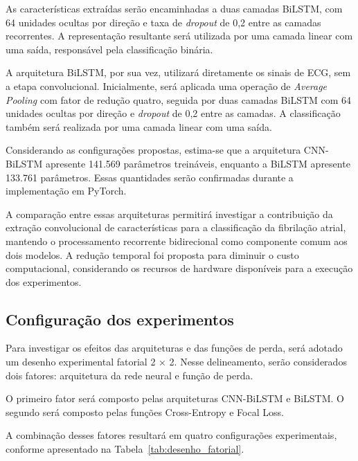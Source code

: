 \documentclass[
    12pt,                %
    openright,           %
    oneside,             %
    a4paper,             %
    english,             %
    brazil               %
]{abntex2}
\begin{document}
As características extraídas serão encaminhadas a
duas camadas BiLSTM, com 64 unidades ocultas por
direção e taxa de \textit{dropout} de 0,2 entre as
camadas recorrentes. A representação resultante
será utilizada por uma camada linear com uma saída,
responsável pela classificação binária.

A arquitetura BiLSTM, por sua vez, utilizará
diretamente os sinais de ECG, sem a etapa convolucional.
Inicialmente, será aplicada uma operação de
\textit{Average Pooling} com fator de redução quatro,
seguida por duas camadas BiLSTM com 64 unidades
ocultas por direção e \textit{dropout} de 0,2
entre as camadas. A classificação também será
realizada por uma camada linear com uma saída.

Considerando as configurações propostas, estima-se
que a arquitetura CNN-BiLSTM apresente 141.569
parâmetros treináveis, enquanto a BiLSTM apresente
133.761 parâmetros. Essas quantidades serão
confirmadas durante a implementação em PyTorch.

A comparação entre essas arquiteturas permitirá
investigar a contribuição da extração convolucional
de características para a classificação da
fibrilação atrial, mantendo o processamento
recorrente bidirecional como componente comum
aos dois modelos. A redução temporal foi proposta
para diminuir o custo computacional, considerando
os recursos de hardware disponíveis para a
execução dos experimentos.


\subsection{Configuração dos experimentos}
\label{subsec:config_experimentos}
Para investigar os efeitos das arquiteturas e das funções de perda, será adotado um desenho experimental fatorial 2 × 2. Nesse delineamento, serão considerados dois fatores: arquitetura da rede neural e função de perda.

O primeiro fator será composto pelas arquiteturas CNN-BiLSTM e BiLSTM. O segundo será composto pelas funções Cross-Entropy e Focal Loss.

A combinação desses fatores resultará em quatro configurações experimentais, conforme apresentado na Tabela~\ref{tab:desenho_fatorial}.


\end{document}
